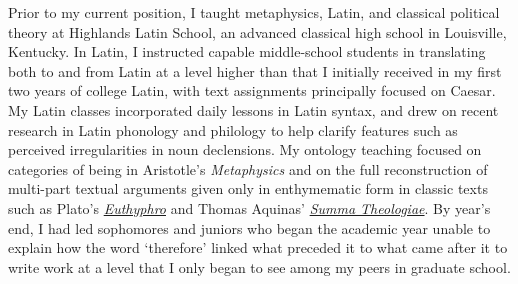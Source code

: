 Prior to my current position, 
I taught metaphysics, Latin, and classical political theory at Highlands Latin School, 
an advanced classical high school in Louisville, Kentucky. 
In Latin, I instructed capable middle-school students in translating both to and from Latin at a level higher than that I initially received in my first two years of college Latin, 
with text assignments principally focused on Caesar. 
My Latin classes incorporated daily lessons in Latin syntax, 
and drew on recent research in Latin phonology and philology to help clarify features such as perceived irregularities in noun declensions. 
My ontology teaching focused on categories of being in Aristotle's \emph{Metaphysics} 
and on the full reconstruction of multi-part textual arguments given only in enthymematic form in classic texts such as Plato's \href{https://jacobarchambault.com/teaching-materials/philosophy-of-human-nature/philosophy-of-human-nature-homework/}{\emph{Euthyphro}} and Thomas Aquinas' \href{https://jacobarchambault.com/teaching-materials/philosophy-of-human-nature/}{\emph{Summa Theologiae}}. 
By year's end, I had led sophomores and juniors who began the academic year unable to explain how the word `therefore' linked what preceded it to what came after it to write work at a level that I only began to see among my peers in graduate school. 
